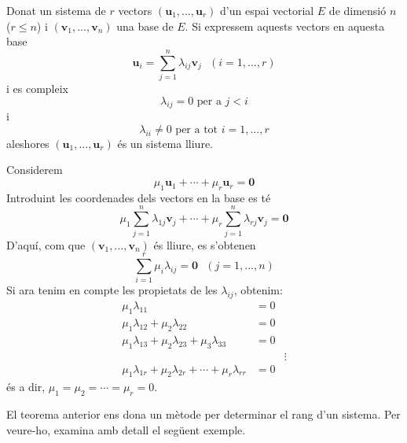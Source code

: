 \begin{teorema}
Donat un sistema de $r$ vectors $(\mathbf{u}_{1},...,\mathbf{u}_{r})$ d’un
espai vectorial $E$ de dimensió $n$ ($r\leq n$) i $(\mathbf{v%
}_{1},...,\mathbf{v}_{n})$ una base de $E$. Si expressem aquests
vectors en aquesta base 
\begin{equation*}
\mathbf{u}_{i}=\sum_{j=1}^{n}\lambda _{ij}\mathbf{v}_{j}\text{ \ \ }%
(i=1,...,r)
\end{equation*}
i es compleix%
\begin{equation*}
\lambda _{ij}=0\text{ per a }j<i
\end{equation*}%
i%
\begin{equation*}
\lambda _{ii}\neq 0\text{ per a tot }i=1,...,r
\end{equation*}%
aleshores $(\mathbf{u}_{1},...,\mathbf{u}_{r})$ és un sistema lliure.

\end{teorema}
\begin{prova}
Considerem%
\begin{equation*}
\mu _{1}\mathbf{u}_{1}+\cdots +\mu _{r}\mathbf{u}_{r}=\mathbf{0}
\end{equation*}%
Introduint les coordenades dels vectors en la base es té%
\begin{equation*}
\mu _{1}\sum_{j=1}^{n}\lambda _{1j}\mathbf{v}_{j}+\cdots +\mu
_{r}\sum_{j=1}^{n}\lambda _{rj}\mathbf{v}_{j}=\mathbf{0}
\end{equation*}%
D’aquí, com que $(\mathbf{v}_{1},...,\mathbf{v}_{n})$ és lliure, es
s’obtenen%
\begin{equation*}
\sum_{i=1}^{r}\mu _{i}\lambda _{ij}=\mathbf{0}\text{ \ \ }(j=1,...,n)
\end{equation*}%
Si ara tenim en compte les propietats de les $\lambda _{ij}$, obtenim:%
\begin{align*}
\mu _{1}\lambda _{11} &=0 \\
\mu _{1}\lambda _{12}+\mu _{2}\lambda _{22} &=0 \\
\mu _{1}\lambda _{13}+\mu _{2}\lambda _{23}+\mu _{3}\lambda _{33} &=0 \\
&&\vdots \\
\mu _{1}\lambda _{1r}+\mu _{2}\lambda _{2r}+\cdots +\mu _{r}\lambda _{rr}
&=0
\end{align*}%
és a dir, $\mu _{1}=\mu _{2}=\cdots =\mu _{r}=0$.
\end{prova}

\begin{observacio}
El teorema anterior ens dona un mètode per determinar el rang d’un
sistema. Per veure-ho, examina amb detall el següent exemple.
\end{observacio}

